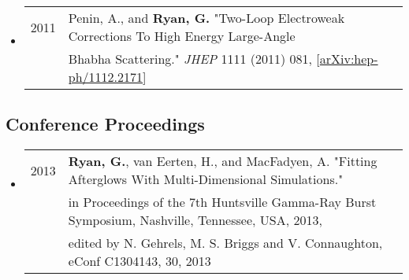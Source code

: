 \begin{itemize}
\item \begin{tabular}{ll}
2011 & Penin, A., and {\bf Ryan, G.}  "Two-Loop Electroweak Corrections To High Energy Large-Angle \\& Bhabha Scattering." \emph{JHEP} 1111 (2011) 081, [\href{https://arxiv.org/abs/1112.2171}{arXiv:hep-ph/1112.2171}] \\
\end{tabular}
\end{itemize}

\subsection*{Conference Proceedings}
\begin{itemize}
\item \begin{tabular}{ll}
2013 & {\bf Ryan, G.}, van Eerten, H., and MacFadyen, A. "Fitting Afterglows With Multi-Dimensional Simulations." \\& in Proceedings of the 7th Huntsville Gamma-Ray Burst Symposium, Nashville, Tennessee, USA, 2013, \\& edited by N. Gehrels, M. S. Briggs and V. Connaughton, eConf C1304143, 30, 2013 \\
\end{tabular}
\end{itemize}


